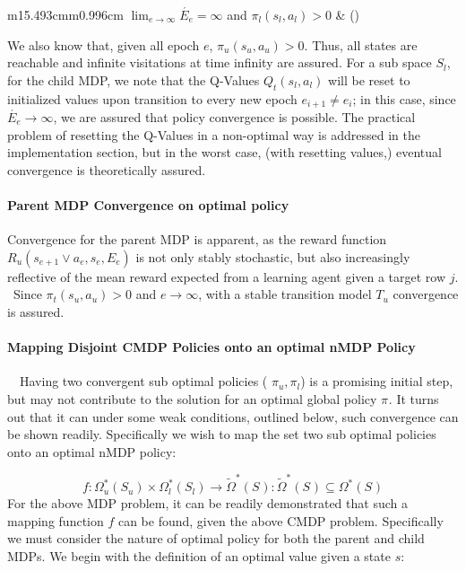 \documentclass{article}
\makeatletter
\newcommand\arraybslash{\let\\\@arraycr}
\newcounter{Equation}
\renewcommand\theEquation{\arabic{Equation}}
\makeatother
\begin{document}
\begin{flushleft}
\tablefirsthead{}
\tablehead{}
\tabletail{}
\tablelasttail{}
\begin{supertabular}{m{15.493cm}m{0.996cm}}
\centering  $\lim _{e\rightarrow {\infty}}\acute{E_e}={\infty}$ and  $\pi _l\left(s_l,a_l\right)>0$ &
\centering\arraybslash (\stepcounter{Equation}{\theEquation})\\
\end{supertabular}
\end{flushleft}
We also know that, given all epoch  $e$,  $\pi _u\left(s_u,a_u\right)>0$. Thus, all states are reachable and infinite visitations at time infinity are assured. For a sub space  $S_l$, for the child MDP, we note that the Q-Values  $Q_t(s_l,a_l)$ will be reset to initialized values upon transition to every new epoch  $e_{i+1}{\neq}e_i$; in this case, since  $\acute{E_e}\rightarrow {\infty}$, we are assured that policy convergence is possible. The practical problem of resetting the Q-Values in a non-optimal way is addressed in the implementation section, but in the worst case, (with resetting values,) eventual convergence is theoretically assured. 

\paragraph{Parent MDP Convergence on optimal policy}
Convergence for the parent MDP is apparent, as the reward function  $R_u\left(s_{e+1}\vee a_e,s_e,E_e\right)$ is not only stably stochastic, but also increasingly reflective of the mean reward expected from a learning agent given a target row  $j$. \ Since  $\pi _t\left(s_u,a_u\right)>0$ and  $e\rightarrow {\infty}$, with a stable transition model  $T_u$ convergence is assured.

\paragraph{Mapping Disjoint CMDP Policies onto an optimal nMDP Policy}
\ \ Having two convergent sub optimal policies ( $\pi _u,\pi _l$) is a promising initial step, but may not contribute to the solution for an optimal global policy  $\pi _{}.$ It turns out that it can under some weak conditions, outlined below, such convergence can be shown readily. Specifically we wish to map the set two sub optimal policies onto an optimal nMDP policy:

\begin{equation}
f:\Omega _u^{\ast }\left(S_u\right)\times \Omega _l^{\ast }\left(S_l\right)\rightarrow \widetilde{\Omega }_{}^{\ast }\left(S_{}\right):\widetilde{\Omega }_{}^{\ast }\left(S_{}\right){\subseteq}\Omega _{}^{\ast }\left(S_{}\right)
\end{equation}
For the above MDP problem, it can be readily demonstrated that such a mapping function  $f$ can be found, given the above CMDP problem. Specifically we must consider the nature of optimal policy for both the parent and child MDPs. We begin with the definition of an optimal value given a state  $s$:
\end{document}
